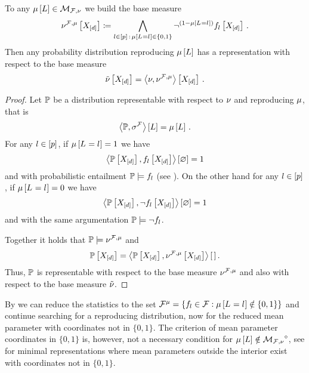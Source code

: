 \begin{theorem}\label{the:hlnMeanPolytopeReduction}
	To any $\mu\left[L\right]\in\mathcal{M}_{\mathcal{F},\nu}$ we build the base measure
			\[ \nu^{\mathcal{F},\mu}\left[X_{[d]}\right] \coloneqq \bigwedge_{l\in[p] \, : \, \mu\left[L_{}=l_{}\right]\in\{0,1\}}
		\lnot^{(1-\mu\left[L_{}=l_{}\right])} f_{l}\left[X_{[d]}\right] \, . \]
	Then any probability distribution reproducing $\mu\left[L\right]$ has a representation with respect to the base measure
		\[ \tilde{\nu}\left[X_{[d]}\right] =  \left\langle \nu,\nu^{\mathcal{F},\mu}\right\rangle \left[ X_{[d]} \right] \, . \]
\end{theorem}
\begin{proof}
	Let $\mathbb{P}$ be a distribution representable with respect to $\nu$ and reproducing $\mu$, that is
		\[ \left\langle \mathbb{P},\sigma^{\mathcal{F}}\right\rangle \left[ L \right] = \mu\left[L\right] \, . \]
	For any $l\in[p]$, if $\mu\left[L_{}=l_{}\right]=1$ we have
		\[  \left\langle \mathbb{P}\left[X_{[d]}\right],f_{l}\left[X_{[d]}\right]\right\rangle \left[ \varnothing \right] =1 \]
	and with  probabilistic entailment $\mathbb{P}\models f_{l}$ (see ).
	On the other hand for any $l\in[p]$, if $\mu\left[L_{}=l_{}\right]=0$ we have
		\[  \left\langle \mathbb{P}\left[X_{[d]}\right],\lnot f_{l}\left[X_{[d]}\right]\right\rangle \left[ \varnothing \right] =1 \]
	and with the same argumentation $\mathbb{P}\models\lnot f_{l}$.

	Together it holds that $\mathbb{P}\models\nu^{\mathcal{F},\mu}$ and
		\[  \mathbb{P}\left[X_{[d]}\right] = \left\langle \mathbb{P}\left[X_{[d]}\right],\nu^{\mathcal{F},\mu}\left[X_{[d]}\right]\right\rangle \left[ \, \right] . \]
	Thus, $\mathbb{P}$ is representable with respect to the base measure $\nu^{\mathcal{F},\mu}$ and also with respect to the base measure $\tilde{\nu}$.
\end{proof}

By  we can reduce the statistics to the set $\mathcal{F}^{\mu}=\{f_{l}\in\mathcal{F} : \mu\left[L_{}=l_{}\right]\notin\{0,1\}\}$ and continue searching for a reproducing distribution, now for the reduced mean parameter with coordinates not in $\{0,1\}$.
The criterion of mean parameter coordinates in $\{0,1\}$ is, however, not a necessary condition for $\mu\left[L\right]\notin{\mathcal{M}_{\mathcal{F},\nu}}^{\circ}$, see  for minimal representations where mean parameters outside the interior exist with coordinates not in $\{0,1\}$.

